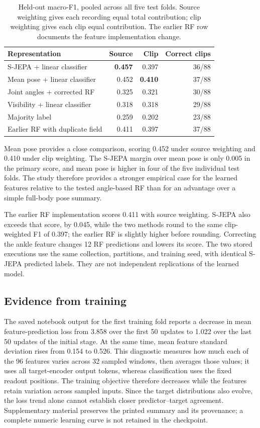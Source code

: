 \documentclass[10pt,twocolumn,letterpaper]{article}
\begin{document}
\begin{table}[t]
\centering
\caption{Held-out macro-F1, pooled across all five test folds. Source weighting gives each recording equal total contribution; clip weighting gives each clip equal contribution. The earlier RF row documents the feature implementation change.}
\label{tab:results}
\small\setlength{\tabcolsep}{4pt}
\begin{tabular}{lrrr}
\toprule
Representation & Source & Clip & Correct clips\\
\midrule
S-JEPA + linear classifier &\textbf{0.457}&0.397&36/88\\
Mean pose + linear classifier &0.452&\textbf{0.410}&37/88\\
Joint angles + corrected RF &0.325&0.321&30/88\\
Visibility + linear classifier &0.318&0.318&29/88\\
Majority label &0.259&0.202&23/88\\
\midrule
Earlier RF with duplicate field &0.411&0.397&37/88\\
\bottomrule
\end{tabular}
\end{table}

Mean pose provides a close comparison, scoring 0.452 under source weighting and 0.410 under clip weighting. The S-JEPA margin over mean pose is only 0.005 in the primary score, and mean pose is higher in four of the five individual test folds. The study therefore provides a stronger empirical case for the learned features relative to the tested angle-based RF than for an advantage over a simple full-body pose summary.

The earlier RF implementation scores 0.411 with source weighting. S-JEPA also exceeds that score, by 0.045, while the two methods round to the same clip-weighted F1 of 0.397; the earlier RF is slightly higher before rounding. Correcting the ankle feature changes 12 RF predictions and lowers its score. The two stored executions use the same collection, partitions, and training seed, with identical S-JEPA predicted labels. They are not independent replications of the learned model.

\subsection{Evidence from training}
The saved notebook output for the first training fold reports a decrease in mean feature-prediction loss from 3.858 over the first 50 updates to 1.022 over the last 50 updates of the initial stage. At the same time, mean feature standard deviation rises from 0.154 to 0.526. This diagnostic measures how much each of the 96 features varies across 32 sampled windows, then averages those values; it uses all target-encoder output tokens, whereas classification uses the fixed readout positions. The training objective therefore decreases while the features retain variation across sampled inputs. Since the target distributions also evolve, the loss trend alone cannot establish closer predictor--target agreement. Supplementary material preserves the printed summary and its provenance; a complete numeric learning curve is not retained in the checkpoint.
\end{document}
